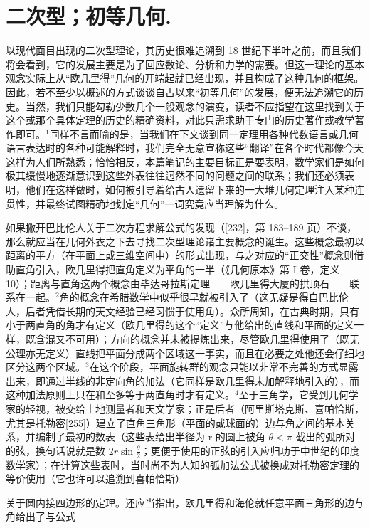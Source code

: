 \chapter{二次型；初等几何.}

以现代面目出现的二次型理论，其历史很难追溯到 18 世纪下半叶之前，而且我们将会看到，它的发展主要是为了回应数论、分析和力学的需要。但这一理论的基本观念实际上从“欧几里得”几何的开端起就已经出现，并且构成了这种几何的框架。因此，若不至少以概述的方式谈谈自古以来“初等几何”的发展，便无法追溯它的历史。当然，我们只能勾勒少数几个一般观念的演变，读者不应指望在这里找到关于这个或那个具体定理的历史的精确资料，对此只需求助于专门的历史著作或教学著作即可。\(^{1}\)同样不言而喻的是，当我们在下文谈到同一定理用各种代数语言或几何语言表达时的各种可能解释时，我们完全无意宣称这些“翻译”在各个时代都像今天这样为人们所熟悉；恰恰相反，本篇笔记的主要目标正是要表明，数学家们是如何极其缓慢地逐渐意识到这些外表往往迥然不同的问题之间的联系；我们还必须表明，他们在这样做时，如何被引导着给古人遗留下来的一大堆几何定理注入某种连贯性，并最终试图精确地划定“几何”一词究竟应当理解为什么。

如果撇开巴比伦人关于二次方程求解公式的发现（{[}232{]}，第 183–189 页）不谈，那么就应当在几何外衣之下去寻找二次型理论诸主要概念的诞生。这些概念最初以距离的平方（在平面上或三维空间中）的形式出现，与之对应的“正交性”概念则借助直角引入，欧几里得把直角定义为平角的一半（《几何原本》第 I 卷，定义 10）；距离与直角这两个概念由毕达哥拉斯定理——欧几里得大厦的拱顶石——联系在一起。\(^{2}\)角的概念在希腊数学中似乎很早就被引入了（这无疑是得自巴比伦人，后者凭借长期的天文经验已经习惯于使用角）。众所周知，在古典时期，只有小于两直角的角才有定义（欧几里得的这个“定义”与他给出的直线和平面的定义一样，既含混又不可用）；方向的概念并未被提炼出来，尽管欧几里得使用了（既无公理亦无定义）直线把平面分成两个区域这一事实，而且在必要之处他还会仔细地区分这两个区域。\(^{3}\)在这个阶段，平面旋转群的观念只能以非常不完善的方式显露出来，即通过半线的非定向角的加法（它同样是欧几里得未加解释地引入的），而这种加法原则上只在和至多等于两直角时才有定义。\(^{4}\)至于三角学，它受到几何学家的轻视，被交给土地测量者和天文学家；正是后者（阿里斯塔克斯、喜帕恰斯，尤其是托勒密{[}255{]}）建立了直角三角形（平面的或球面的）边与角之间的基本关系，并编制了最初的数表（这些表给出半径为 r 的圆上被角 \(\theta < \pi\) 截出的弧所对的弦，换句话说就是数 \(2r \sin \frac{\theta}{2}\)；更便于使用的正弦的引入应归功于中世纪的印度数学家）；在计算这些表时，当时尚不为人知的弧加法公式被换成对托勒密定理的等价使用（它也许可以追溯到喜帕恰斯）

关于圆内接四边形的定理。还应当指出，欧几里得和海伦就任意平面三角形的边与角给出了与公式


